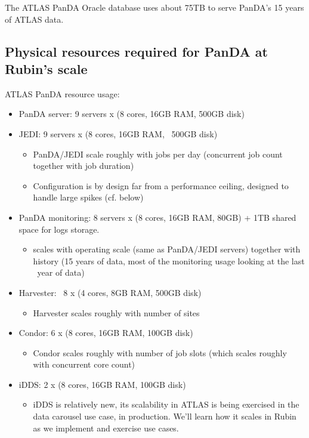 The ATLAS PanDA Oracle database uses about 75TB to serve PanDA’s 15 years of ATLAS data.

\subsection{Physical resources required for PanDA at Rubin’s scale}
ATLAS PanDA resource usage:

\begin{itemize}
\item PanDA server: 9 servers x (8 cores, 16GB RAM, 500GB disk)
\item JEDI: 9 servers x (8 cores, 16GB RAM, ~500GB disk)
\begin{itemize}
\item PanDA/JEDI scale roughly with jobs per day (concurrent job count together with job duration)
\item Configuration is by design far from a performance ceiling, designed to handle large spikes (cf. below)
\end{itemize}
\item PanDA monitoring: 8 servers x (8 cores, 16GB RAM, 80GB) + 1TB shared space for logs storage.
\begin{itemize}
\item scales with operating scale (same as PanDA/JEDI servers) together with history (15 years of data, most of the monitoring usage looking at the last ~year of data)
\end{itemize}
\item Harvester: ~8 x (4 cores, 8GB RAM, 500GB disk)
\begin{itemize}
\item Harvester scales roughly with number of sites
\end{itemize}
\item Condor: 6 x (8 cores, 16GB RAM, 100GB disk)
\begin{itemize}
\item Condor scales roughly with number of job slots (which scales roughly with concurrent core count)
\end{itemize}
\item iDDS: 2 x (8 cores, 16GB RAM, 100GB disk)
\begin{itemize}
\item iDDS is relatively new, its scalability in ATLAS is being exercised in the data carousel use case, in production. We’ll learn how it scales in Rubin as we implement and exercise use cases.
\end{itemize}
\end{itemize}


